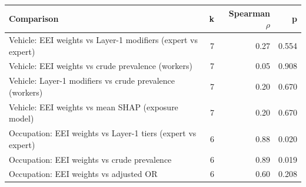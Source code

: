 \begin{tabular}{lrrr}
\toprule
Comparison & k & Spearman $\rho$ & p \\
\midrule
Vehicle: EEI weights vs Layer-1 modifiers (expert vs expert) & 7 & 0.27 & 0.554 \\
Vehicle: EEI weights vs crude prevalence (workers) & 7 & 0.05 & 0.908 \\
Vehicle: Layer-1 modifiers vs crude prevalence (workers) & 7 & 0.20 & 0.670 \\
Vehicle: EEI weights vs mean SHAP (exposure model) & 7 & 0.20 & 0.670 \\
\midrule
Occupation: EEI weights vs Layer-1 tiers (expert vs expert) & 6 & 0.88 & 0.020 \\
Occupation: EEI weights vs crude prevalence & 6 & 0.89 & 0.019 \\
Occupation: EEI weights vs adjusted OR & 6 & 0.60 & 0.208 \\
\bottomrule
\end{tabular}
